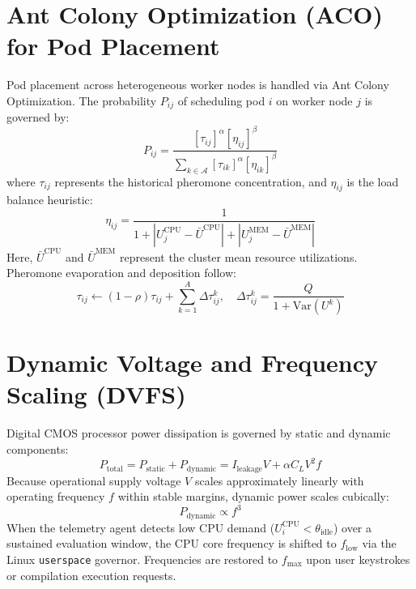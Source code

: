 \documentclass[12pt,a4paper]{report}
\begin{document}
	\section{Ant Colony Optimization (ACO) for Pod Placement}
	Pod placement across heterogeneous worker nodes is handled via Ant Colony Optimization. The probability $P_{ij}$ of scheduling pod $i$ on worker node $j$ is governed by:
	\begin{equation}
		P_{ij} = \frac{[\tau_{ij}]^\alpha [\eta_{ij}]^\beta}{\sum_{k \in \mathcal{A}} [\tau_{ik}]^\alpha [\eta_{ik}]^\beta}
	\end{equation}
	where $\tau_{ij}$ represents the historical pheromone concentration, and $\eta_{ij}$ is the load balance heuristic:
	\begin{equation}
		\eta_{ij} = \frac{1}{1 + |U_j^{\text{CPU}} - \bar{U}^{\text{CPU}}| + |U_j^{\text{MEM}} - \bar{U}^{\text{MEM}}|}
	\end{equation}
	Here, $\bar{U}^{\text{CPU}}$ and $\bar{U}^{\text{MEM}}$ represent the cluster mean resource utilizations. Pheromone evaporation and deposition follow:
	\begin{equation}
		\tau_{ij} \leftarrow (1 - \rho)\tau_{ij} + \sum_{k=1}^A \Delta \tau_{ij}^k, \quad \Delta \tau_{ij}^k = \frac{Q}{1 + \mathrm{Var}(U^k)}
	\end{equation}
	
	\section{Dynamic Voltage and Frequency Scaling (DVFS)}
	Digital CMOS processor power dissipation is governed by static and dynamic components:
	\begin{equation}
		P_{\text{total}} = P_{\text{static}} + P_{\text{dynamic}} = I_{\text{leakage}} V + \alpha C_L V^2 f
	\end{equation}
	Because operational supply voltage $V$ scales approximately linearly with operating frequency $f$ within stable margins, dynamic power scales cubically:
	\begin{equation}
		P_{\text{dynamic}} \propto f^3
	\end{equation}
	When the telemetry agent detects low CPU demand ($U_i^{\text{CPU}} < \theta_{\text{idle}}$) over a sustained evaluation window, the CPU core frequency is shifted to $f_{\text{low}}$ via the Linux \texttt{userspace} governor. Frequencies are restored to $f_{\max}$ upon user keystrokes or compilation execution requests.
	
\end{document}
